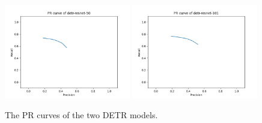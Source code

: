\begin{figure}[h]
    \captionsetup{width=\textwidth}
    \includegraphics[width=0.49\textwidth]{figures/detr-resnet-50.png}
    \includegraphics[width=0.49\textwidth]{figures/detr-resnet-101.png}
    \caption{The PR curves of the two DETR models.}
    \label{fig:pr_detr}
\end{figure}

